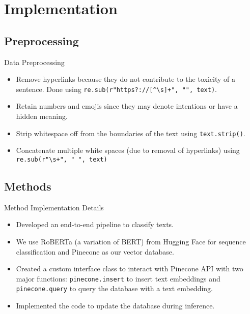 \section{Implementation}


\subsection{Preprocessing}

\begin{frame}{Data Preprocessing}

  \begin{itemize}
    \item Remove hyperlinks because they do not contribute to the toxicity of a sentence. Done using \texttt{re.sub(r"https?://[\textasciicircum \textbackslash s]+", "", text)}.
    \item Retain numbers and emojis since they may denote intentions or have a hidden meaning.
    \item Strip whitespace off from the boundaries of the text using \texttt{text.strip()}.
    \item Concatenate multiple white spaces (due to removal of hyperlinks) using \texttt{re.sub(r"\textbackslash s+", " ", text)}
  \end{itemize}
  
\end{frame}


\subsection{Methods}

\begin{frame}{Method Implementation Details}

  \begin{itemize}
    \item Developed an end-to-end pipeline to classify texts.
    \item We use RoBERTa (a variation of BERT) \citep{liu2019roberta} from Hugging Face for sequence classification and Pinecone as our vector database.
    \item Created a custom interface class to interact with Pinecone API with two major functions: \texttt{pinecone.insert} to insert text embeddings and \texttt{pinecone.query} to query the database with a text embedding.
    \item Implemented the code to update the database during inference.
  \end{itemize}
    
\end{frame}

